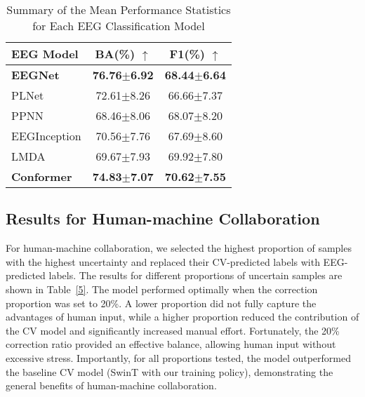 \documentclass[preprint,12pt,authoryear]{elsarticle}
\begin{document}
\begin{table}[ht]
\caption{Summary of the Mean Performance Statistics for Each EEG Classification Model}  %
\footnotesize  %
\label{4}
\centering
\begin{tabular}{lcc}
\toprule
\textbf{EEG Model} & \textbf{BA(\%)} $\uparrow$ & \textbf{F1(\%)} $\uparrow$ \\
\midrule
\textbf{EEGNet} \cite{lawhern2018eegnet}& \textbf{76.76$\pm$6.92} & \textbf{68.44$\pm$6.64} \\
PLNet \cite{zang2021deep}& 72.61$\pm$8.26 & 66.66$\pm$7.37 \\
PPNN \cite{li2021phase}& 68.46$\pm$8.06 & 68.07$\pm$8.20 \\
EEGInception\cite{santamaria2020eeg} & 70.56$\pm$7.76 & 67.69$\pm$8.60 \\
LMDA \cite{miao2023lmda}& 69.67$\pm$7.93 & 69.92$\pm$7.80 \\
\textbf{Conformer} \cite{song2022eeg}& \textbf{74.83$\pm$7.07} & \textbf{70.62$\pm$7.55} \\
\bottomrule
\end{tabular}
\end{table}



\subsection{Results for Human-machine Collaboration}

For human-machine collaboration, we selected the highest proportion of samples with the highest uncertainty and replaced their CV-predicted labels with EEG-predicted labels. The results for different proportions of uncertain samples are shown in Table~\ref{5}. The model performed optimally when the correction proportion was set to 20\%. A lower proportion did not fully capture the advantages of human input, while a higher proportion reduced the contribution of the CV model and significantly increased manual effort. Fortunately, the 20\% correction ratio provided an effective balance, allowing human input without excessive stress. Importantly, for all proportions tested, the model outperformed the baseline CV model (SwinT with our training policy), demonstrating the general benefits of human-machine collaboration.
\end{document}
